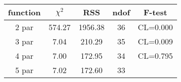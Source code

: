 \begin{tabular}{c|c|c|c|c}
function & $\chi^2$ & RSS & ndof & F-test \\
\hline
2 par & 574.27 & 1956.38 & 36 & CL=0.000 \\
3 par & 7.04 & 210.29 & 35 & CL=0.009 \\
4 par & 7.00 & 172.95 & 34 & CL=0.795 \\
5 par & 7.02 & 172.60 & 33 & \\
\hline
\end{tabular}